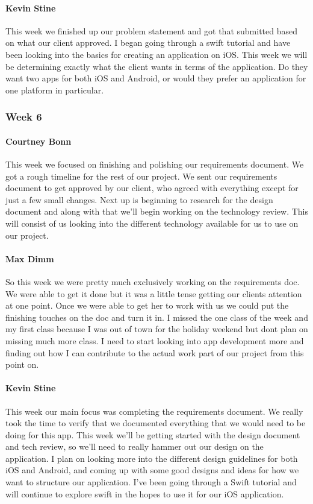 \documentclass[letterpaper,10pt,draftclsnofoot,onecolumn,titlepage]{IEEEtran}
\begin{document}
			\paragraph{Kevin Stine}
			This week we finished up our problem statement and got that submitted based on what our client approved. I began going through a swift tutorial and have been looking into the basics for creating an application on iOS. This week we will be determining exactly what the client wants in terms of the application. Do they want two apps for both iOS and Android, or would they prefer an application for one platform in particular.
			
		\subsubsection{Week 6}
		
			\paragraph{Courtney Bonn}
			This week we focused on finishing and polishing our requirements document. We got a rough timeline for the rest of our project. We sent our requirements document to get approved by our client, who agreed with everything except for just a few small changes. Next up is beginning to research for the design document and along with that we'll begin working on the technology review. This will consist of us looking into the different technology available for us to use on our project.

			\paragraph{Max Dimm}
			So this week we were pretty much exclusively working on the requirements doc. We were able to get it done but it was a little tense getting our clients attention at one point. Once we were able to get her to work with us we could put the finishing touches on the doc and turn it in. I missed the one class of the week and my first class because I was out of town for the holiday weekend but dont plan on missing much more class. I need to start looking into app development more and finding out how I can contribute to the actual work part of our project from this point on.
			
			\paragraph{Kevin Stine}
			This week our main focus was completing the requirements document. We really took the time to verify that we documented everything that we would need to be doing for this app. This week we'll be getting started with the design document and tech review, so we'll need to really hammer out our design on the application. I plan on looking more into the different design guidelines for both iOS and Android, and coming up with some good designs and ideas for how we want to structure our application. I've been going through a Swift tutorial and will continue to explore swift in the hopes to use it for our iOS application.
			
\end{document}
